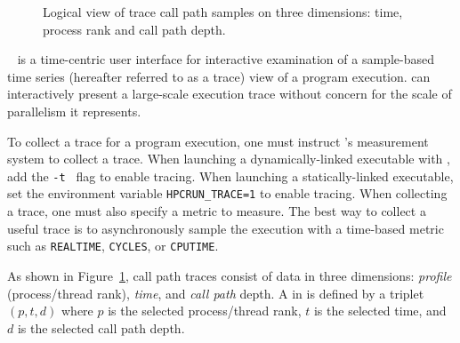 

\begin{figure}[t]
\caption{Logical view of trace call path samples on three dimensions: time, process rank and call path depth.}
\label{fig:hpctraceviewer-callpath}
\end{figure}

\hpctraceviewer{}~\cite{Tallent-MC-etal:2011:ICS-hpctoolkit-scalable-tracing} is a time-centric user interface for interactive examination of a sample-based time series (hereafter referred to as a trace) view of a program execution.
 \hpctraceviewer{} can interactively present a large-scale execution trace without concern for the scale of parallelism it represents.

To collect a trace for a program execution, one must instruct \HPCToolkit{}'s measurement system to collect a trace. 
When launching a dynamically-linked executable with \hpcrun{}, add the {\tt -t } flag to enable tracing. 
When launching a statically-linked executable, set the environment variable \verb|HPCRUN_TRACE=1| to enable tracing. 
When collecting a trace, one must also specify a metric to measure.  The best way to collect a useful trace is to asynchronously sample the execution with a time-based metric such as {\tt REALTIME}, {\tt CYCLES}, or {\tt CPUTIME}.

As shown in Figure~\ref{fig:hpctraceviewer-callpath},  call path traces consist of data in three dimensions: \emph{profile} (process/thread rank), \emph{time}, and \emph{call path} depth.
A \emph{\crosshair} in \hpctraceviewer{} is defined by a triplet $(p,t,d)$ where $p$ is the selected process/thread rank, $t$ is the selected time, and $d$ is the selected call path depth. 

